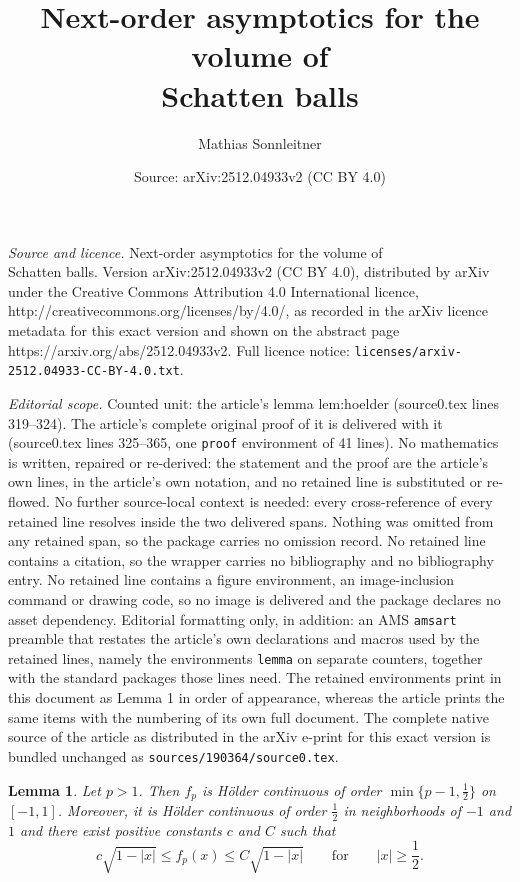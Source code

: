 \documentclass[10pt,a4paper]{amsart}
\title{Next-order asymptotics for the volume of \\ Schatten balls}
\author{Mathias Sonnleitner}
\date{Source: arXiv:2512.04933v2 (CC BY 4.0)}
\newtheorem{lemma}{Lemma}
\begin{document}
\maketitle

\noindent\emph{Source and licence.} Next-order asymptotics for the volume of \\ Schatten balls. Version arXiv:2512.04933v2 (CC BY 4.0), distributed by arXiv under the Creative Commons Attribution 4.0 International licence, http://creativecommons.org/licenses/by/4.0/, as recorded in the arXiv licence metadata for this exact version and shown on the abstract page https://arxiv.org/abs/2512.04933v2. Full licence notice: \texttt{licenses/arxiv-2512.04933-CC-BY-4.0.txt}.\par\smallskip

\noindent\textit{Editorial scope.} Counted unit: the article's lemma lem:hoelder (source0.tex lines 319--324). The article's complete original proof of it is delivered with it (source0.tex lines 325--365, one \texttt{proof} environment of 41 lines). No mathematics is written, repaired or re-derived: the statement and the proof are the article's own lines, in the article's own notation, and no retained line is substituted or re-flowed.  No further source-local context is needed: every cross-reference of every retained line resolves inside the two delivered spans.  Nothing was omitted from any retained span, so the package carries no omission record.  No retained line contains a citation, so the wrapper carries no bibliography and no bibliography entry.  No retained line contains a figure environment, an image-inclusion command or drawing code, so no image is delivered and the package declares no asset dependency.  Editorial formatting only, in addition: an AMS \texttt{amsart} preamble that restates the article's own declarations and macros used by the retained lines, namely the environments \texttt{lemma} on separate counters, together with the standard packages those lines need.  The retained environments print in this document as Lemma 1 in order of appearance, whereas the article prints the same items with the numbering of its own full document.  The complete native source of the article as distributed in the arXiv e-print for this exact version is bundled unchanged as \texttt{sources/190364/source0.tex}.
\begin{lemma} \label{lem:hoelder}
	Let $p>1$. Then $f_p$ is Hölder continuous of order $\min\{p-1,\frac{1}{2}\}$ on $[-1,1]$. Moreover, it is Hölder continuous of order $\frac{1}{2}$ in neighborhoods of $-1$ and $1$ and there exist positive constants $c$ and $C$ such that 
\begin{equation} \label{eq:tail}
	c\sqrt{1-|x|}\le f_p(x) \le C\sqrt{1-|x|}\qquad \text{for}\qquad |x|\ge\frac{1}{2}.
\end{equation}
\end{lemma}
\end{document}
